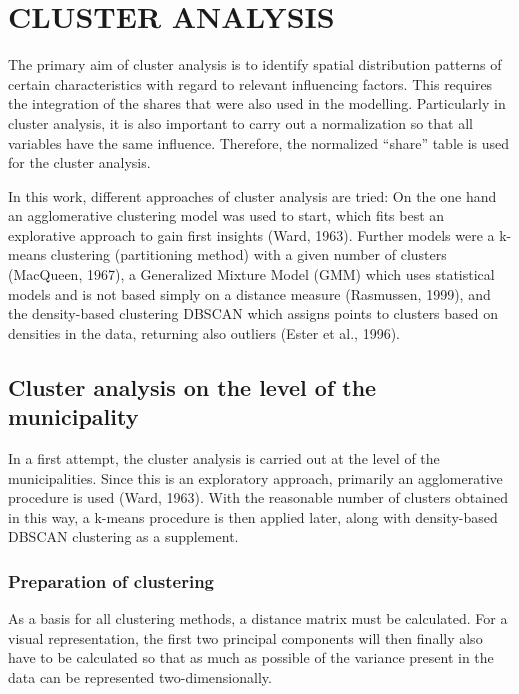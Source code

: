 \documentclass[
]{article}
\begin{document}
\newpage

\hypertarget{cluster-analysis}{%
\section{CLUSTER ANALYSIS}\label{cluster-analysis}}

The primary aim of cluster analysis is to identify spatial distribution
patterns of certain characteristics with regard to relevant influencing
factors. This requires the integration of the shares that were also used
in the modelling. Particularly in cluster analysis, it is also important
to carry out a normalization so that all variables have the same
influence. Therefore, the normalized ``share'' table is used for the
cluster analysis.

In this work, different approaches of cluster analysis are tried: On the
one hand an agglomerative clustering model was used to start, which fits
best an explorative approach to gain first insights (Ward, 1963).
Further models were a k-means clustering (partitioning method) with a
given number of clusters (MacQueen, 1967), a Generalized Mixture Model
(GMM) which uses statistical models and is not based simply on a
distance measure (Rasmussen, 1999), and the density-based clustering
DBSCAN which assigns points to clusters based on densities in the data,
returning also outliers (Ester et al., 1996).

\hypertarget{cluster-analysis-on-the-level-of-the-municipality}{%
\subsection{Cluster analysis on the level of the
municipality}\label{cluster-analysis-on-the-level-of-the-municipality}}

In a first attempt, the cluster analysis is carried out at the level of
the municipalities. Since this is an exploratory approach, primarily an
agglomerative procedure is used (Ward, 1963). With the reasonable number
of clusters obtained in this way, a k-means procedure is then applied
later, along with density-based DBSCAN clustering as a supplement.

\hypertarget{preparation-of-clustering}{%
\subsubsection{Preparation of
clustering}\label{preparation-of-clustering}}

As a basis for all clustering methods, a distance matrix must be
calculated. For a visual representation, the first two principal
components will then finally also have to be calculated so that as much
as possible of the variance present in the data can be represented
two-dimensionally.
\end{document}
